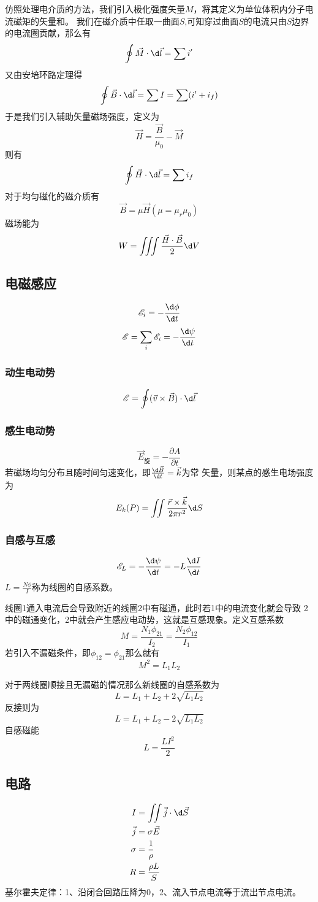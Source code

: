 \documentclass[12pt, a4paper, oneside]{ctexart}
\newcommand{\E}{\mathscr{E}}
\begin{document}
仿照处理电介质的方法，我们引入极化强度矢量$M$，将其定义为单位体积内分子电流磁矩的矢量和。
我们在磁介质中任取一曲面$S$,可知穿过曲面$S$的电流只由$S$边界的电流圈贡献，那么有
$$\oint \vec{M}\cdot\d \vec{l}=\sum i'$$
又由安培环路定理得
$$\oint \vec{B}\cdot\d\vec{l}=\sum I=\sum(i'+i_f)$$
于是我们引入辅助矢量磁场强度，定义为
$$\vec{H}=\frac{\vec{B}}{\mu_0}-\vec{M}$$
则有
$$\oint \vec{H}\cdot\d \vec{l}=\sum i_f$$
对于均匀磁化的磁介质有
$$\vec{B}=\mu\vec{H}(\mu=\mu_r\mu_0)$$
磁场能为
$$W=\iiint \frac{\vec{H}\cdot\vec{B}}{2}\d V$$
\subsection{电磁感应}
$$\E_i=-\frac{\d \phi}{\d t}$$
$$\E=\sum_i\E_i=-\frac{\d \psi}{\d t}$$
\subsubsection{动生电动势}
$$\E=\oint (\vec{v}\times\vec{B})\cdot\d \vec{l}$$
\subsubsection{感生电动势}
$$\vec{E}_{\text{旋}}=-\frac{\partial A}{\partial t}$$
若磁场均匀分布且随时间匀速变化，即$\frac{\d \vec{B}}{\d t}=\vec{k}$为常
矢量，则某点的感生电场强度为
$$E_k(P)=\iint \frac{\vec{r}\times \vec{k}}{2\pi r^2}\d S$$
\subsubsection{自感与互感}
$$\E_L=-\frac{\d \psi}{\d t}=-L\frac{\d I}{\d t}$$
$L=\frac{N\phi}{I}$称为线圈的自感系数。

线圈1通入电流后会导致附近的线圈2中有磁通，此时若1中的电流变化就会导致
2中的磁通变化，2中就会产生感应电动势，这就是互感现象。定义互感系数
$$M=\frac{N_1\phi_{21}}{I_2}=\frac{N_2\phi_{12}}{I_1}$$
若引入不漏磁条件，即$\phi_{12}=\phi_{21}$那么就有
$$M^2=L_1L_2$$

对于两线圈顺接且无漏磁的情况那么新线圈的自感系数为
$$L=L_1+L_2+2\sqrt{L_1L_2}$$
反接则为
$$L=L_1+L_2-2\sqrt{L_1L_2}$$
自感磁能
$$L=\frac{LI^2}{2}$$
\subsection{电路}
$$\begin{aligned}
    I&=\iint \vec{j}\cdot \d \vec{S}\\
    \vec{j}&=\sigma\vec{E}\\
    \sigma&=\frac{1}{\rho}\\
    R&=\frac{\rho L}{S}
\end{aligned}$$
基尔霍夫定律：1、沿闭合回路压降为0，2、流入节点电流等于流出节点电流。
\end{document}
